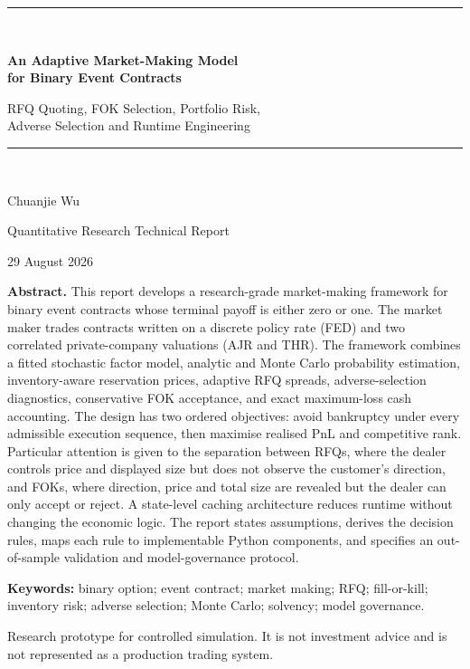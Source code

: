 \documentclass[10pt,a4paper]{article}
\newcommand{\1}{\mathbf{1}}
\begin{document}
\hypersetup{pageanchor=false}

\begin{titlepage}
\thispagestyle{empty}
\centering
\vspace*{1.1cm}
{\color{navy}\rule{\textwidth}{1.2pt}}\\[1.0cm]
{\LARGE\bfseries An Adaptive Market-Making Model\\[4pt]
for Binary Event Contracts\par}
\vspace{0.55cm}
{\large RFQ Quoting, FOK Selection, Portfolio Risk,\\
Adverse Selection and Runtime Engineering\par}
\vspace{0.8cm}
{\color{navy}\rule{0.78\textwidth}{0.8pt}}\\[0.9cm]
{\large Chuanjie Wu\par}
\vspace{0.25cm}
{\normalsize Quantitative Research Technical Report\par}
\vspace{0.2cm}
{\normalsize 29 August 2026\par}

\vfill
\begin{minipage}{0.88\textwidth}
\small
\textbf{Abstract.}
This report develops a research-grade market-making framework for binary event
contracts whose terminal payoff is either zero or one.  The market maker trades
contracts written on a discrete policy rate (FED) and two correlated private-company
valuations (AJR and THR).  The framework combines a fitted stochastic factor model,
analytic and Monte Carlo probability estimation, inventory-aware reservation prices,
adaptive RFQ spreads, adverse-selection diagnostics, conservative FOK acceptance,
and exact maximum-loss cash accounting.  The design has two ordered objectives:
avoid bankruptcy under every admissible execution sequence, then maximise realised
PnL and competitive rank.  Particular attention is given to the separation between
RFQs, where the dealer controls price and displayed size but does not observe the
customer's direction, and FOKs, where direction, price and total size are revealed but
the dealer can only accept or reject.  A state-level caching architecture reduces
runtime without changing the economic logic.  The report states assumptions,
derives the decision rules, maps each rule to implementable Python components, and
specifies an out-of-sample validation and model-governance protocol.

\vspace{0.5cm}
\textbf{Keywords:} binary option; event contract; market making; RFQ; fill-or-kill;
inventory risk; adverse selection; Monte Carlo; solvency; model governance.
\end{minipage}

\vfill
{\footnotesize Research prototype for controlled simulation.  It is not investment advice
and is not represented as a production trading system.}
\end{titlepage}
\end{document}
